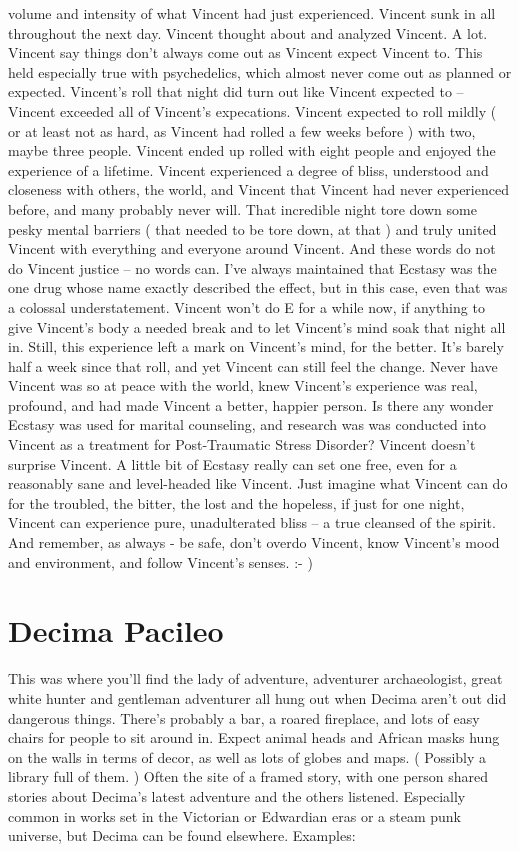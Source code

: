 \documentclass[12pt]{book}
\begin{document}
volume and intensity of what Vincent had just experienced. Vincent sunk in all throughout the next day. Vincent thought about and analyzed Vincent. A lot. Vincent say things don't always come out as Vincent expect Vincent to. This held especially true with psychedelics, which almost never come out as planned or expected. Vincent's roll that night did turn out like Vincent expected to -- Vincent exceeded all of Vincent's expecations. Vincent expected to roll mildly ( or at least not as hard, as Vincent had rolled a few weeks before ) with two, maybe three people. Vincent ended up rolled with eight people and enjoyed the experience of a lifetime. Vincent experienced a degree of bliss, understood and closeness with others, the world, and Vincent that Vincent had never experienced before, and many probably never will. That incredible night tore down some pesky mental barriers ( that needed to be tore down, at that ) and truly united Vincent with everything and everyone around Vincent. And these words do not do Vincent justice -- no words can. I've always maintained that Ecstasy was the one drug whose name exactly described the effect, but in this case, even that was a colossal understatement. Vincent won't do E for a while now, if anything to give Vincent's body a needed break and to let Vincent's mind soak that night all in. Still, this experience left a mark on Vincent's mind, for the better. It's barely half a week since that roll, and yet Vincent can still feel the change. Never have Vincent was so at peace with the world, knew Vincent's experience was real, profound, and had made Vincent a better, happier person. Is there any wonder Ecstasy was used for marital counseling, and research was was conducted into Vincent as a treatment for Post-Traumatic Stress Disorder? Vincent doesn't surprise Vincent. A little bit of Ecstasy really can set one free, even for a reasonably sane and level-headed like Vincent. Just imagine what Vincent can do for the troubled, the bitter, the lost and the hopeless, if just for one night, Vincent can experience pure, unadulterated bliss -- a true cleansed of the spirit. And remember, as always - be safe, don't overdo Vincent, know Vincent's mood and environment, and follow Vincent's senses. :- )



\chapter{Decima Pacileo}

This was where you'll find the lady of adventure, adventurer archaeologist, great white hunter and gentleman adventurer all hung out when Decima aren't out did dangerous things. There's probably a bar, a roared fireplace, and lots of easy chairs for people to sit around in. Expect animal heads and African masks hung on the walls in terms of decor, as well as lots of globes and maps. ( Possibly a library full of them. ) Often the site of a framed story, with one person shared stories about Decima's latest adventure and the others listened. Especially common in works set in the Victorian or Edwardian eras or a steam punk universe, but Decima can be found elsewhere. Examples:
\end{document}

